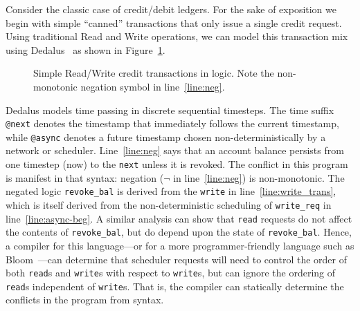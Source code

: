 \documentclass{sig-alternate}
\newcommand{\paa}[1]{{\textcolor{blue}{[[#1 -- paa]]}}}
\begin{document}
Consider the classic case of credit/debit ledgers. For the sake of exposition we begin with simple ``canned'' transactions that only issue a single credit request.  Using
traditional Read and Write operations, we can model this transaction mix using Dedalus~\cite{dedalus} as
shown in Figure~\ref{fig:balance}.

\begin{figure}[ht]
\begin{scriptsize}

\centering
\vspace{-10pt}
\caption{Simple Read/Write credit transactions in logic.  Note the non-monotonic negation symbol in line~\ref{line:neg}.}
\label{fig:balance}
\end{scriptsize}
\vspace{-2pt}
\end{figure}

Dedalus models time passing in discrete sequential timesteps.
The time suffix \texttt{@next} denotes the timestamp that immediately follows the
current timestamp, while \texttt{@async} denotes a 
future timestamp chosen non-deterministically by a network or scheduler.  
Line~\ref{line:neg} says that an account balance persists from one timestep (now) to the \texttt{next} unless it is revoked. The
conflict in this program is manifest in that syntax: negation
($\neg$ in line~\ref{line:neg}) is non-monotonic.  
The negated logic \texttt{revoke\_bal} is derived from the \texttt{write} in line~\ref{line:write_trans}, 
which is itself derived from the non-deterministic scheduling of \texttt{write\_req} 
in line~\ref{line:async-beg}.  A similar analysis can show that \texttt{read} requests do not affect the contents of \texttt{revoke\_bal}, but do depend upon the state of \texttt{revoke\_bal}.
Hence, a compiler for this language---or for a more programmer-friendly language
such as Bloom~\cite{Alvaro2011}---can determine that scheduler requests will need to control the order of both \texttt{read}s and \texttt{write}s with respect to \texttt{write}s, but can ignore the ordering of \texttt{read}s independent of \texttt{write}s.  That is, the compiler can statically determine the conflicts in the program from syntax.
\end{document}
